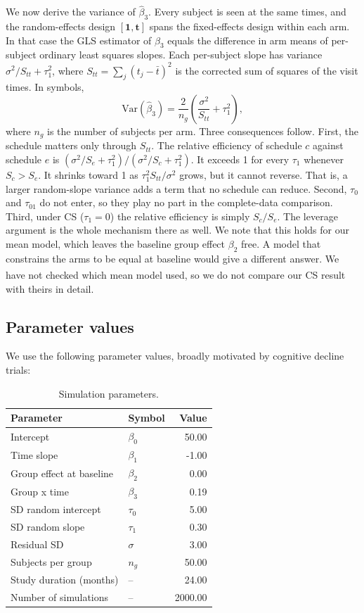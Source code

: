 \documentclass[
  11pt,
]{article}
\begin{document}
We now derive the variance of \(\hat{\beta}_3\). Every subject is
seen at the same times, and the random-effects design
\([\mathbf{1}, \mathbf{t}]\) spans the fixed-effects design within
each arm. In that case the GLS estimator of \(\beta_3\) equals the
difference in arm means of per-subject ordinary least squares
slopes. Each per-subject slope has variance \(\sigma^2 / S_{tt} +
\tau_1^2\), where \(S_{tt} = \sum_j (t_j - \bar{t})^2\) is the
corrected sum of squares of the visit times. In symbols,
\[\text{Var}(\hat{\beta}_3) = \frac{2}{n_g}
  \left( \frac{\sigma^2}{S_{tt}} + \tau_1^2 \right),\]
where \(n_g\) is the number of subjects per arm. Three consequences
follow. First, the schedule matters only through \(S_{tt}\). The
relative efficiency of schedule \(c\) against schedule \(e\) is
\((\sigma^2 / S_e + \tau_1^2) / (\sigma^2 / S_c + \tau_1^2)\). It
exceeds 1 for every \(\tau_1\) whenever \(S_c > S_e\). It shrinks
toward 1 as \(\tau_1^2 S_{tt} / \sigma^2\) grows, but it cannot
reverse. That is, a larger random-slope variance adds a term that
no schedule can reduce. Second, \(\tau_0\) and \(\tau_{01}\) do not
enter, so they play no part in the complete-data comparison.
Third, under CS (\(\tau_1 = 0\)) the relative efficiency is simply
\(S_c / S_e\). The leverage argument is the whole mechanism there
as well. We note that this holds for our mean model, which leaves
the baseline group effect \(\beta_2\) free. A model that constrains
the arms to be equal at baseline would give a different answer.
We have not checked which mean model\textsuperscript{} used, so we do not compare
our CS result with theirs in detail.

\subsection{Parameter values}\label{parameter-values}

We use the following parameter values, broadly motivated by
cognitive decline trials:

\begin{table}[!h]
\centering
\caption{\label{tab:params}Simulation parameters.}
\centering
\fontsize{10}{12}\selectfont
\begin{tabular}[t]{llr}
\toprule
Parameter & Symbol & Value\\
\midrule
Intercept & $\beta_0$ & 50.00\\
Time slope & $\beta_1$ & -1.00\\
Group effect at baseline & $\beta_2$ & 0.00\\
Group x time & $\beta_3$ & 0.19\\
SD random intercept & $\tau_0$ & 5.00\\
\addlinespace
SD random slope & $\tau_1$ & 0.30\\
Residual SD & $\sigma$ & 3.00\\
Subjects per group & $n_g$ & 50.00\\
Study duration (months) & -- & 24.00\\
Number of simulations & -- & 2000.00\\
\bottomrule
\end{tabular}
\end{table}
\end{document}
